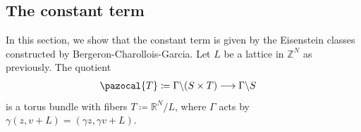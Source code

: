 \documentclass[a4paper,11pt]{amsart} %
\newcommand{\8}{\infty}
\newcommand{\Z}{\mathbb{Z}}
\newcommand{\vbf}{\mathbf{v}}
\newcommand{\R}{\mathbb{R}}
\newcommand{\Tcal}{\pazocal{T}}
\theoremstyle{mytheoremstyle}
\theoremstyle{remark}
\numberwithin{equation}{section}
\begin{document}
 
 
 

\subsection{The constant term}
\label{eulerclass}
In this section, we show that the constant term is given by the Eisenstein classes constructed by Bergeron-Charollois-Garcia. Let $L$ be a lattice in $\Z^N$ as previously. The quotient 
\begin{align}
 \Tcal \coloneqq \Gamma \backslash (S \times T) & \longrightarrow \Gamma \backslash S
\end{align}
is a torus bundle with fibers $T\coloneqq \R^N/L$, where $\Gamma$ acts by $\gamma(z,v+L)=(\gamma z,\gamma v+L)$.
\end{document}
